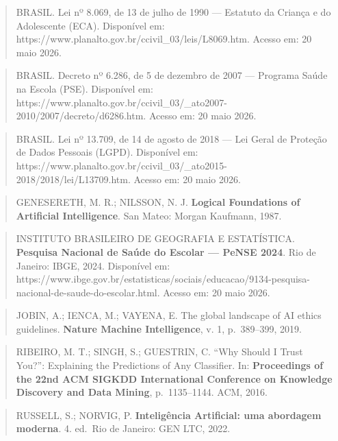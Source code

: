 \documentclass[11pt]{article}
\begin{document}
\begin{quote}
BRASIL. Lei nº 8.069, de 13 de julho de 1990 --- Estatuto da Criança e
do Adolescente (ECA). Disponível em:
https://www.planalto.gov.br/ccivil\_03/leis/L8069.htm. Acesso em: 20
maio 2026.
\end{quote}

\begin{quote}
BRASIL. Decreto nº 6.286, de 5 de dezembro de 2007 --- Programa Saúde na
Escola (PSE). Disponível em:
https://www.planalto.gov.br/ccivil\_03/\_ato2007-2010/2007/decreto/d6286.htm.
Acesso em: 20 maio 2026.
\end{quote}

\begin{quote}
BRASIL. Lei nº 13.709, de 14 de agosto de 2018 --- Lei Geral de Proteção
de Dados Pessoais (LGPD). Disponível em:
https://www.planalto.gov.br/ccivil\_03/\_ato2015-2018/2018/lei/L13709.htm.
Acesso em: 20 maio 2026.
\end{quote}

\begin{quote}
GENESERETH, M. R.; NILSSON, N. J. \textbf{Logical Foundations of
Artificial Intelligence}. San Mateo: Morgan Kaufmann, 1987.
\end{quote}

\begin{quote}
INSTITUTO BRASILEIRO DE GEOGRAFIA E ESTATÍSTICA. \textbf{Pesquisa
Nacional de Saúde do Escolar --- PeNSE 2024}. Rio de Janeiro: IBGE,
2024. Disponível em:
https://www.ibge.gov.br/estatisticas/sociais/educacao/9134-pesquisa-nacional-de-saude-do-escolar.html.
Acesso em: 20 maio 2026.
\end{quote}

\begin{quote}
JOBIN, A.; IENCA, M.; VAYENA, E. The global landscape of AI ethics
guidelines. \textbf{Nature Machine Intelligence}, v. 1, p.~389--399,
2019.
\end{quote}

\begin{quote}
RIBEIRO, M. T.; SINGH, S.; GUESTRIN, C. ``Why Should I Trust You?'':
Explaining the Predictions of Any Classifier. In: \textbf{Proceedings of
the 22nd ACM SIGKDD International Conference on Knowledge Discovery and
Data Mining}, p.~1135--1144. ACM, 2016.
\end{quote}

\begin{quote}
RUSSELL, S.; NORVIG, P. \textbf{Inteligência Artificial: uma abordagem
moderna}. 4. ed.~Rio de Janeiro: GEN LTC, 2022.
\end{quote}
\end{document}
